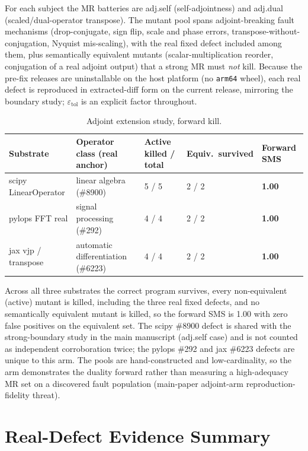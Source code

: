 \documentclass[manuscript,screen,review]{acmart}
\begin{document}
For each subject the MR batteries are adj.self (self-adjointness) and
adj.dual (scaled/dual-operator transpose). The mutant pool spans
adjoint-breaking fault mechanisms (drop-conjugate, sign flip, scale and
phase errors, transpose-without-conjugation, Nyquist mis-scaling), with
the real fixed defect included among them, plus semantically equivalent
mutants (scalar-multiplication reorder, conjugation of a real adjoint
output) that a strong MR must \emph{not} kill. Because the pre-fix
releases are uninstallable on the host platform (no \texttt{arm64} wheel),
each real defect is reproduced in extracted-diff form on the current
release, mirroring the boundary study; $\varepsilon_{\mathrm{tol}}$ is an
explicit factor throughout.

{%
\begin{longtable}[]{@{}p{2.0cm}p{3.2cm}p{2.5cm}p{1.8cm}p{1.8cm}@{}}
\caption{Adjoint extension study, forward kill.}\label{tab:suppl-adjoint}\\
\toprule\noalign{}
Substrate & Operator class (real anchor) & Active killed / total & Equiv.\ survived & Forward SMS \\
\midrule\noalign{}
\endfirsthead
\endhead
\bottomrule\noalign{}
\endlastfoot
scipy LinearOperator & linear algebra (\#8900) & 5 / 5 & 2 / 2 & \textbf{1.00} \\
pylops FFT real & signal processing (\#292) & 4 / 4 & 2 / 2 & \textbf{1.00} \\
jax vjp / transpose & automatic differentiation (\#6223) & 4 / 4 & 2 / 2 & \textbf{1.00} \\
\end{longtable}
}

Across all three substrates the correct program survives, every
non-equivalent (active) mutant is killed, including the three real
fixed defects, and no semantically equivalent mutant is killed, so the
forward SMS is 1.00 with zero false positives on the equivalent set. The
scipy \#8900 defect is shared with the strong-boundary study in the main manuscript (adj.self case)
and is not counted as independent corroboration twice; the pylops \#292
and jax \#6223 defects are unique to this arm. The pools are
hand-constructed and low-cardinality, so the arm demonstrates the duality
forward rather than measuring a high-adequacy MR set on a discovered fault
population (main-paper adjoint-arm reproduction-fidelity threat).

\section{Real-Defect Evidence Summary}\label{i.-result-level-real-defect-evidence-ledger}
\end{document}
